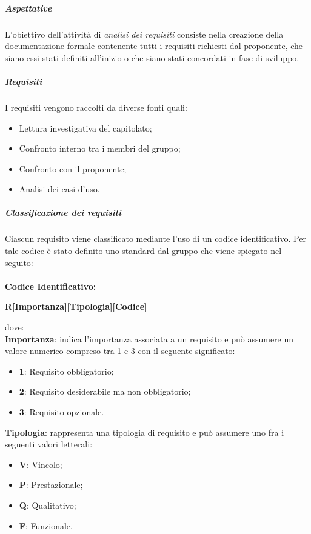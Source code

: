             \subparagraph{Aspettative} \label{subparagraph:ADR_Aspettative}
            L’obiettivo dell’attività di \textit{analisi dei requisiti} consiste nella creazione della documentazione formale contenente tutti i requisiti 
            richiesti dal proponente, che siano essi stati definiti all'inizio o che siano stati concordati in fase di sviluppo.

            \subparagraph{Requisiti} \label{subparagraph:Requisiti}
            I requisiti vengono raccolti da diverse fonti quali:
            \begin{itemize}
               \item Lettura investigativa del capitolato;
                \item Confronto interno tra i membri del gruppo;
                \item Confronto con il proponente;
                \item Analisi dei casi d'uso.
            \end{itemize}

            \subparagraph{Classificazione dei requisiti} \label{subparagraph:Classificazione dei requisiti}
            Ciascun requisito viene classificato mediante l'uso di un codice identificativo. Per tale codice è stato definito uno standard dal gruppo che viene spiegato nel seguito:\\\\
            \textbf{Codice Identificativo:}\\
            \begin{center}
                \textbf{\Large{R[Importanza][Tipologia][Codice]}}
            \end{center}
            dove:\\

            \textbf{Importanza}: indica l'importanza associata a un requisito e può assumere un valore numerico compreso tra 1 e 3 con il seguente significato:
                \begin{itemize}[label={}]
                    \item \textbf{1}: Requisito obbligatorio;
                    \item \textbf{2}: Requisito desiderabile ma non obbligatorio;
                    \item \textbf{3}: Requisito opzionale.
                \end{itemize}

            \textbf{Tipologia}: rappresenta una tipologia di requisito e può assumere uno fra i seguenti valori letterali:
            \begin{itemize}[label={}]
                \item \textbf{V}: Vincolo;
                \item \textbf{P}: Prestazionale;
                \item \textbf{Q}: Qualitativo;
                \item \textbf{F}: Funzionale.
            \end{itemize}


